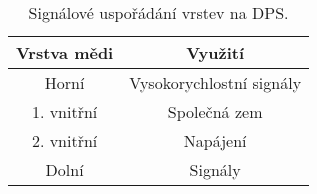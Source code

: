 \begin{table}[h!]
\caption{Signálové uspořádání vrstev na DPS.} 
\centering

\begin{tabular}{|c|c|}
\hline 
Vrstva mědi & Využití \\ 
\hline 
\hline 
Horní & Vysokorychlostní signály \\ 
\hline 
1. vnitřní & Společná zem \\ 
\hline 
2. vnitřní & Napájení \\ 
\hline 
Dolní & Signály \\ 
\hline 
\end{tabular} 


\label{table:signalStackup}
\end{table} 